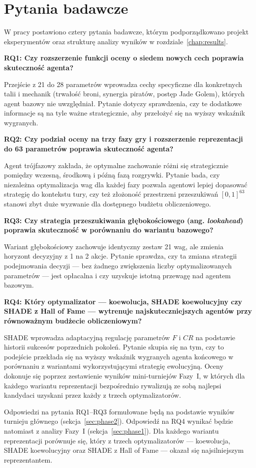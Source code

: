 \section{Pytania badawcze} \label{sec:rq}

W pracy postawiono cztery pytania badawcze, którym podporządkowano projekt eksperymentów oraz strukturę analizy wyników w rozdziale~\ref{chap:results}.

\textbf{RQ1: Czy rozszerzenie funkcji oceny o siedem nowych cech poprawia skuteczność agenta?}

Przejście z 21 do 28 parametrów wprowadza cechy specyficzne dla konkretnych talii i mechanik (trwałość broni, synergia piratów, postęp Jade Golem), których agent bazowy nie uwzględniał. Pytanie dotyczy sprawdzenia, czy te dodatkowe informacje są na tyle ważne strategicznie, aby przełożyć się na wyższy wskaźnik wygranych.

\textbf{RQ2: Czy podział oceny na trzy fazy gry i rozszerzenie reprezentacji do 63 parametrów poprawia skuteczność agenta?}

Agent trójfazowy zakłada, że optymalne zachowanie różni się strategicznie pomiędzy wczesną, środkową i późną fazą rozgrywki. Pytanie bada, czy niezależna optymalizacja wag dla każdej fazy pozwala agentowi lepiej dopasować strategię do kontekstu tury, czy też złożoność przestrzeni przeszukiwań $[0,1]^{63}$ stanowi zbyt duże wyzwanie dla dostępnego budżetu obliczeniowego.

\textbf{RQ3: Czy strategia przeszukiwania głębokościowego (ang. \textit{lookahead}) poprawia skuteczność w porównaniu do wariantu bazowego?}

Wariant głębokościowy zachowuje identyczny zestaw 21 wag, ale zmienia horyzont decyzyjny z 1 na 2 akcje. Pytanie sprawdza, czy ta zmiana strategii podejmowania decyzji --- bez żadnego zwiększenia liczby optymalizowanych parametrów --- jest opłacalna i czy uzyskuje istotną przewagę nad agentem bazowym.

\textbf{RQ4: Który optymalizator --- koewolucja, SHADE koewolucyjny czy SHADE z Hall of Fame --- wytrenuje najskuteczniejszych agentów przy równoważnym budżecie obliczeniowym?}

SHADE wprowadza adaptacyjną regulację parametrów $F$ i $CR$ na podstawie historii sukcesów poprzednich pokoleń. Pytanie skupia się na tym, czy to podejście przekłada się na wyższy wskaźnik wygranych agenta końcowego w porównaniu z wariantami wykorzystującymi strategię ewolucyjną. Oceny dokonuje się poprzez zestawienie wyników mini-turniejów Fazy~I, w których dla każdego wariantu reprezentacji bezpośrednio rywalizują ze sobą najlepsi kandydaci uzyskani przez każdy z trzech optymalizatorów.

Odpowiedzi na pytania RQ1--RQ3 formułowane będą na podstawie wyników turnieju głównego (sekcja~\ref{sec:phase2}). Odpowiedź na RQ4 wynikać będzie natomiast z analizy Fazy~I (sekcja~\ref{sec:phase1}). Dla każdego wariantu reprezentacji porównuje się, który z trzech optymalizatorów --- koewolucja, SHADE koewolucyjny oraz SHADE z Hall of Fame --- okazał się najsilniejszym reprezentantem.
